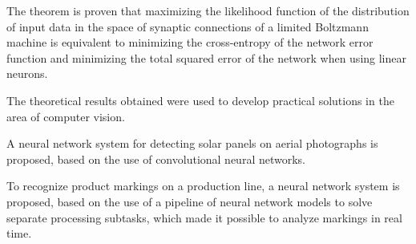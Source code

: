 \documentclass{thesisby}
\begin{document}
The theorem is proven that maximizing the likelihood function of the distribution of input data in the space of synaptic connections of a limited Boltzmann machine is equivalent to minimizing the cross-entropy of the network error function and minimizing the total squared error of the network when using linear neurons.

The theoretical results obtained were used to develop practical solutions in the area of computer vision.

A neural network system for detecting solar panels on aerial photographs is proposed, based on the use of convolutional neural networks.

To recognize product markings on a production line, a neural network system is proposed, based on the use of a pipeline of neural network models to solve separate processing subtasks, which made it possible to analyze markings in real time.

	
	
	
	
	
\end{document}
